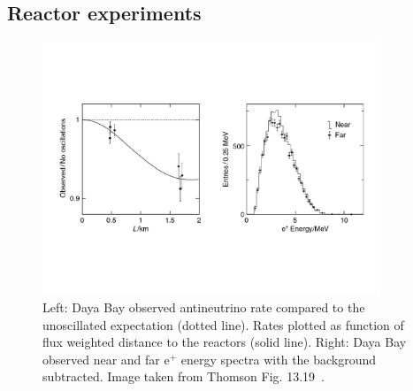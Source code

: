 \subsection{Reactor experiments}

\begin{figure}
  \centering
  \vspace{-15mm}
  \includegraphics[width=0.9\textwidth,keepaspectratio]
                {pictures/t13_19.pdf}
  \vspace*{-20mm}
  \caption{Left: Daya Bay observed antineutrino rate compared to the
           unoscillated expectation (dotted line). Rates plotted as function
           of flux weighted distance to the reactors (solid line). Right:
           Daya Bay observed near and far e$^+$ energy spectra with the
           background subtracted. Image taken from Thomson Fig. 
           13.19~\cite{thomson_modern_2013}.}
  \label{fig:daya}
\end{figure}

